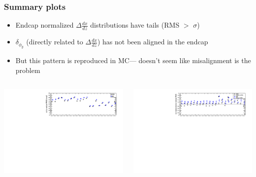 \documentclass[compress]{beamer}
\begin{document}
\begin{frame}
\frametitle{Summary plots}

\begin{itemize}
\item Endcap normalized $\Delta \frac{dx}{dz}$ distributions have tails (RMS $>$ $\sigma$)
\item $\delta_{\phi_y}$ (directly related to $\Delta \frac{dx}{dz}$) has not been aligned in the endcap
\item But this pattern is reproduced in MC--- doesn't seem like misalignment is the problem
\end{itemize}
\begin{columns}
\includegraphics[width=\linewidth]{summarydXdZ.pdf}

\includegraphics[width=\linewidth]{summarydXdZnorm.pdf}


\end{columns}
\end{frame}
\end{document}

